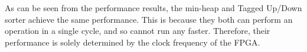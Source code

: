 As can be seen from the performance results, the min-heap and Tagged Up/Down sorter achieve the same performance. This is because they both can perform an operation in a single cycle, and so cannot run any faster. Therefore, their performance is solely determined by the clock frequency of the FPGA.

\begin{table}[t!]
	\centering
	\small
	\caption{Performance Results}
	\label{tab:perf}
\end{table}




